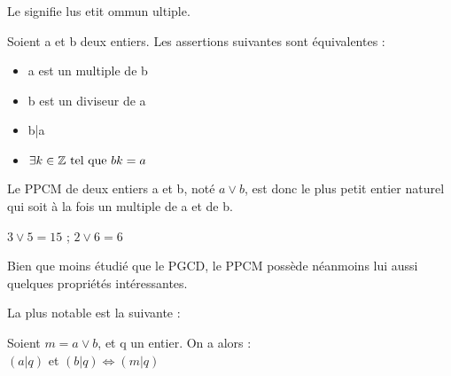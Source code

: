 Le  signifie lus etit ommun ultiple.

\begin{definition}
Soient a et b deux entiers. Les assertions suivantes sont équivalentes :
\begin{itemize}
    \item a est un multiple de b
    \item b est un diviseur de a
    \item b|a
    \item $\exists k \in \mathbb{Z} \ \text{tel que} \ bk = a$
\end{itemize}
\end{definition}
Le PPCM de deux entiers a et b, noté $a \vee b$, est donc le plus petit entier naturel qui soit à la fois un multiple de a et de b.

\begin{example}
$3 \vee 5 = 15$ ; $2 \vee 6 = 6$
\end{example}

Bien que moins étudié que le PGCD, le PPCM possède néanmoins lui aussi quelques propriétés intéressantes.

La plus notable est la suivante :

\begin{theorem}
Soient $m = a \vee b$, et q un entier. On a alors :\\
$(a|q)$ et $(b|q) \iff (m|q)$
\end{theorem}